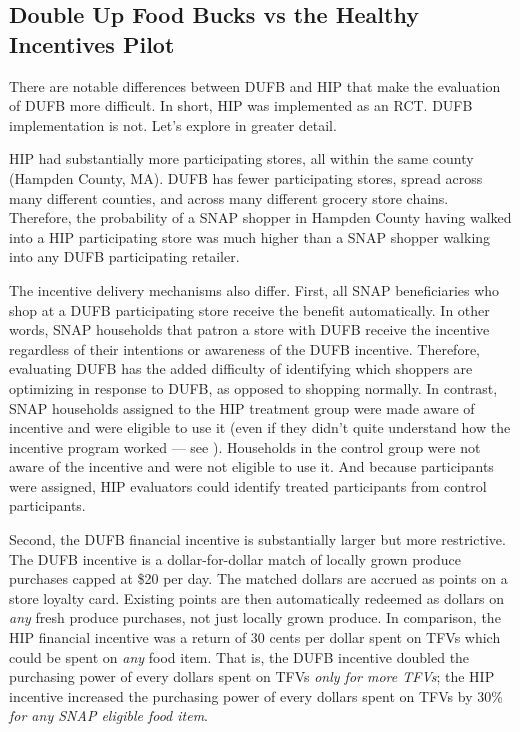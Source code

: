 \documentclass[12pt,letterpaperpaper,]{book}
\begin{document}
\subsection*{Double Up Food Bucks vs the Healthy Incentives
Pilot}\label{double-up-food-bucks-vs-the-healthy-incentives-pilot}

There are notable differences between DUFB and HIP that make the
evaluation of DUFB more difficult. In short, HIP was implemented as an
RCT. DUFB implementation is not. Let's explore in greater detail.

HIP had substantially more participating stores, all within the same
county (Hampden County, MA). DUFB has fewer participating stores, spread
across many different counties, and across many different grocery store
chains. Therefore, the probability of a SNAP shopper in Hampden County
having walked into a HIP participating store was much higher than a SNAP
shopper walking into any DUFB participating retailer.

The incentive delivery mechanisms also differ. First, all SNAP
beneficiaries who shop at a DUFB participating store receive the benefit
automatically. In other words, SNAP households that patron a store with
DUFB receive the incentive regardless of their intentions or awareness
of the DUFB incentive. Therefore, evaluating DUFB has the added
difficulty of identifying which shoppers are optimizing in response to
DUFB, as opposed to shopping normally. In contrast, SNAP households
assigned to the HIP treatment group were made aware of incentive and
were eligible to use it (even if they didn't quite understand how the
incentive program worked --- see \citet{bartlett_evaluation_2014}).
Households in the control group were not aware of the incentive and were
not eligible to use it. And because participants were assigned, HIP
evaluators could identify treated participants from control
participants.

Second, the DUFB financial incentive is substantially larger but more
restrictive. The DUFB incentive is a dollar-for-dollar match of locally
grown produce purchases capped at \$20 per day. The matched dollars are
accrued as points on a store loyalty card. Existing points are then
automatically redeemed as dollars on \emph{any} fresh produce purchases,
not just locally grown produce. In comparison, the HIP financial
incentive was a return of 30 cents per dollar spent on TFVs which could
be spent on \emph{any} food item. That is, the DUFB incentive doubled
the purchasing power of every dollars spent on TFVs \emph{only for more
TFVs}; the HIP incentive increased the purchasing power of every dollars
spent on TFVs by 30\% \emph{for any SNAP eligible food item}.
\end{document}
